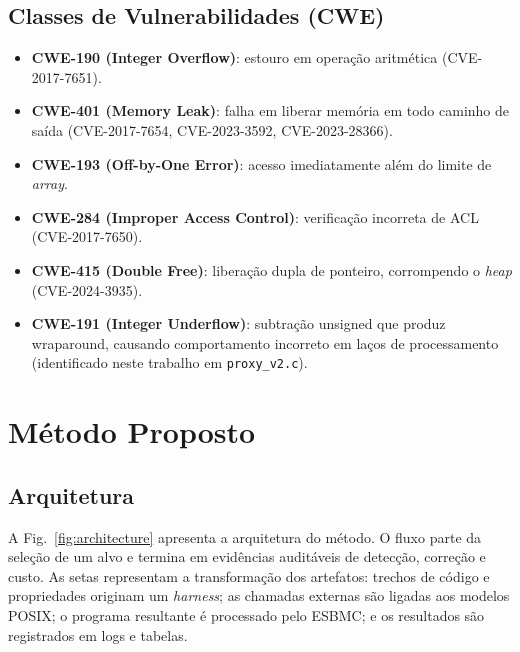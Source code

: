 \documentclass[conference]{IEEEtran}
\begin{document}
\subsection{Classes de Vulnerabilidades (CWE)}
\begin{itemize}
    \item \textbf{CWE-190 (Integer Overflow)}: estouro em opera\c{c}\~ao aritm\'etica
          (CVE-2017-7651).
    \item \textbf{CWE-401 (Memory Leak)}: falha em liberar mem\'oria em todo caminho
          de sa\'ida (CVE-2017-7654, CVE-2023-3592, CVE-2023-28366).
    \item \textbf{CWE-193 (Off-by-One Error)}: acesso imediatamente al\'em do limite
          de \emph{array}.
    \item \textbf{CWE-284 (Improper Access Control)}: verifica\c{c}\~ao incorreta de
          ACL (CVE-2017-7650).
    \item \textbf{CWE-415 (Double Free)}: libera\c{c}\~ao dupla de ponteiro,
          corrompendo o \emph{heap} (CVE-2024-3935).
    \item \textbf{CWE-191 (Integer Underflow)}: subtra\c{c}\~ao unsigned que
          produz wraparound, causando comportamento incorreto em laços de
          processamento (identificado neste trabalho em \texttt{proxy\_v2.c}).
\end{itemize}

\section{M\'etodo Proposto}
\label{sec:metodologia}

\subsection{Arquitetura}
A Fig.~\ref{fig:architecture} apresenta a arquitetura do m\'etodo. O fluxo parte
da sele\c{c}\~ao de um alvo e termina em evid\^encias audit\'aveis de detec\c{c}\~ao,
corre\c{c}\~ao e custo. As setas representam a transforma\c{c}\~ao dos artefatos:
trechos de c\'odigo e propriedades originam um \emph{harness}; as chamadas externas
s\~ao ligadas aos modelos POSIX; o programa resultante \'e processado pelo ESBMC;
e os resultados s\~ao registrados em logs e tabelas.
\end{document}
